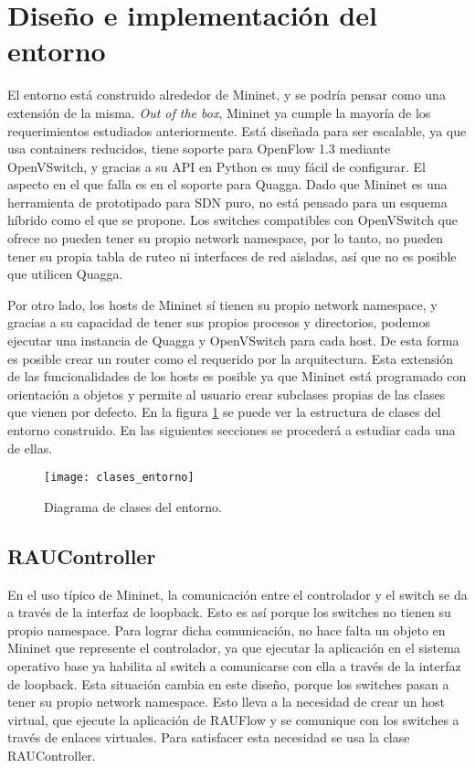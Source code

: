 \section{Diseño e implementación del entorno}
El entorno está construido alrededor de Mininet, y se podría pensar como una extensión de la misma. \textit{Out of the box}, Mininet ya cumple la mayoría de los requerimientos estudiados anteriormente. Está diseñada para ser escalable, ya que usa containers reducidos, tiene soporte para OpenFlow 1.3 mediante OpenVSwitch, y gracias a su API en Python es muy fácil de configurar. El aspecto en el que falla es en el soporte para Quagga. Dado que Mininet es una herramienta de prototipado para SDN puro, no está pensado para un esquema híbrido como el que se propone. Los switches compatibles con OpenVSwitch que ofrece no pueden tener su propio network namespace, por lo tanto, no pueden tener su propia tabla de ruteo ni interfaces de red aisladas, así que no es posible que utilicen Quagga.

Por otro lado, los hosts de Mininet sí tienen su propio network namespace, y gracias a su capacidad de tener sus propios procesos y directorios, podemos ejecutar una instancia de Quagga y OpenVSwitch para cada host. De esta forma es posible crear un router como el requerido por la arquitectura. Esta extensión de las funcionalidades de los hosts es posible ya que Mininet está programado con orientación a objetos y permite al usuario crear subclases propias de las clases que vienen por defecto. En la figura \ref{fig:clases_entorno} se puede ver la estructura de clases del entorno construido. En las siguientes secciones se procederá a estudiar cada una de ellas.

\begin{figure}[t]
	\caption{Diagrama de clases del entorno.}
	\texttt{[image: clases\_entorno]}
	\centering
	\label{fig:clases_entorno}
\end{figure}

\subsection{RAUController}
En el uso típico de Mininet, la comunicación entre el controlador y el switch se da a través de la interfaz de loopback. Esto es así porque los switches no tienen su propio namespace. Para lograr dicha comunicación, no hace falta un objeto en Mininet que represente el controlador, ya que ejecutar la aplicación en el sistema operativo base ya habilita al switch a comunicarse con ella a través de la interfaz de loopback. Esta situación cambia en este diseño, porque los switches pasan a tener su propio network namespace. Esto lleva a la necesidad de crear un host virtual, que ejecute la aplicación de RAUFlow y se comunique con los switches a través de enlaces virtuales. Para satisfacer esta necesidad se usa la clase RAUController.

